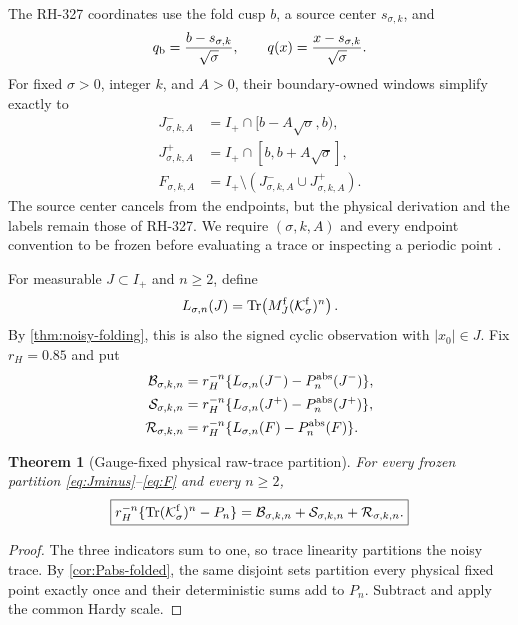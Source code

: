 \documentclass[11pt]{article}
\newtheorem{theorem}{Theorem}[section]
\theoremstyle{remark}
\newcommand{\Tr}{\operatorname{Tr}}
\newcommand{\cB}{\mathcal B}
\newcommand{\cK}{\mathcal K}
\newcommand{\cR}{\mathcal R}
\newcommand{\cS}{\mathcal S}
\begin{document}
The RH-327 coordinates use the fold cusp $b$, a source center
$s_{\sigma,k}$, and
\[
 q_{\rm b}=\frac{b-s_{\sigma,k}}{\sqrt\sigma},
 \qquad q(x)=\frac{x-s_{\sigma,k}}{\sqrt\sigma}.
\]
For fixed $\sigma>0$, integer $k$, and $A>0$, their boundary-owned windows
simplify
exactly to
\begin{align}
 J^-_{\sigma,k,A}
 &=I_+\cap[b-A\sqrt\sigma,b),\label{eq:Jminus}\\
 J^+_{\sigma,k,A}
 &=I_+\cap[b,b+A\sqrt\sigma],\label{eq:Jplus}\\
 F_{\sigma,k,A}&=I_+\setminus(J^-_{\sigma,k,A}\cup J^+_{\sigma,k,A}).
 \label{eq:F}
\end{align}
The source center cancels from the endpoints, but the physical derivation and
the labels remain those of RH-327.  We require $(\sigma,k,A)$ and every
endpoint convention to be frozen before evaluating a trace or inspecting a
periodic point \citep{WangShell2026}.

For measurable $J\subset I_+$ and $n\ge2$, define
\begin{equation}\label{eq:L-local}
 L_{\sigma,n}(J)=\Tr\!\left(M_J^{\rm f}
 (\cK_\sigma^{\rm f})^n\right).
\end{equation}
By \cref{thm:noisy-folding}, this is also the signed cyclic observation with
$|x_0|\in J$.  Fix $r_H=0.85$ and put
\begin{align}
 \cB_{\sigma,k,n}
 &=r_H^{-n}\{L_{\sigma,n}(J^-)-P_n^{\rm abs}(J^-)\},\label{eq:B}\\
 \cS_{\sigma,k,n}
 &=r_H^{-n}\{L_{\sigma,n}(J^+)-P_n^{\rm abs}(J^+)\},\label{eq:S}\\
 \cR_{\sigma,k,n}
 &=r_H^{-n}\{L_{\sigma,n}(F)-P_n^{\rm abs}(F)\}.
 \label{eq:R}
\end{align}

\begin{theorem}[Gauge-fixed physical raw-trace partition]
\label{thm:raw-partition}
For every frozen partition \eqref{eq:Jminus}--\eqref{eq:F} and every
$n\ge2$,
\begin{equation}\label{eq:raw-partition}
 \boxed{
 r_H^{-n}\{\Tr(\cK_\sigma^{\rm f})^n-P_n\}
 =\cB_{\sigma,k,n}+\cS_{\sigma,k,n}+\cR_{\sigma,k,n}.}
\end{equation}
\end{theorem}

\begin{proof}
The three indicators sum to one, so trace linearity partitions the noisy
trace.  By \cref{cor:Pabs-folded}, the same disjoint sets partition every
physical fixed point exactly once and their deterministic sums add to $P_n$.
Subtract and apply the common Hardy scale.
\end{proof}
\end{document}
